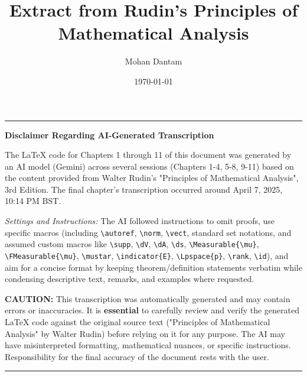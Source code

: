 \documentclass{book} %
\title{Extract from Rudin's Principles of Mathematical Analysis}
\author{Mohan Dantam}
\date{\today} %
\begin{document}
\frontmatter %

\maketitle %

\tableofcontents %

\par\bigskip\hrule\bigskip\par
\noindent\textbf{Disclaimer Regarding AI-Generated Transcription}

\par\medskip\noindent
The LaTeX code for Chapters 1 through 11 of this document was
generated by an AI model (Gemini) across several sessions (Chapters
1-4, 5-8, 9-11) based on the content provided from Walter Rudin's
"Principles of Mathematical Analysis", 3rd Edition. The final
chapter's transcription occurred around April 7, 2025, 10:14 PM BST.

\par\medskip\noindent
\textit{Settings and Instructions:} The AI followed instructions to
omit proofs, use specific macros (including \verb|\autoref|,
  \verb|\norm|, \verb|\vect|, standard set notations, and assumed
  custom macros like \verb|\supp|, \verb|\dV|, \verb|\dA|, \verb|\ds|,
  \verb|\Measurable{\mu}|, \verb|\FMeasurable{\mu}|, \verb|\mustar|,
\verb|\indicator{E}|, \verb|\Lpspace{p}|, \verb|\rank|, \verb|\id|),
and aim for a concise format by keeping theorem/definition statements
verbatim while condensing descriptive text, remarks, and examples
where requested.

\par\medskip\noindent
\textbf{CAUTION:} This transcription was automatically generated and
may contain errors or inaccuracies. It is \textbf{essential} to
carefully review and verify the generated LaTeX code against the
original source text ("Principles of Mathematical Analysis" by Walter
Rudin) before relying on it for any purpose. The AI may have
misinterpreted formatting, mathematical nuances, or specific
instructions. Responsibility for the final accuracy of the document
rests with the user.

\par\bigskip\hrule\bigskip\par

\end{document}
